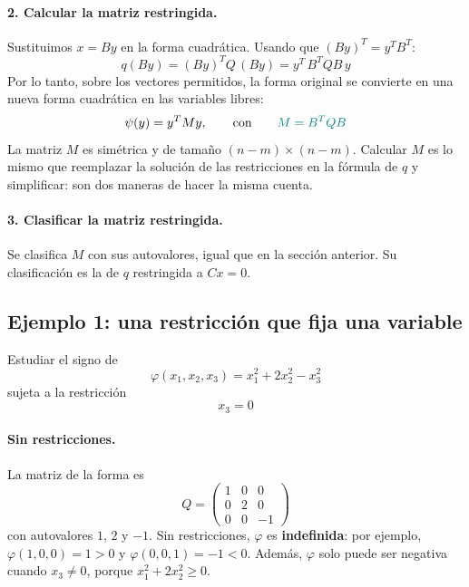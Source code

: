 \documentclass{article}
\begin{document}
\paragraph*{2. Calcular la matriz restringida.}
Sustituimos \(x=By\) en la forma cuadrática. Usando que \((By)^T=y^TB^T\):
\[
q(By)=(By)^T Q\,(By)=y^T\,B^TQB\,y
\]
Por lo tanto, sobre los vectores permitidos, la forma original se convierte en una nueva forma cuadrática en las variables libres:
\[
\psi(y)=y^TMy,
\qquad\text{con}\qquad
\color{teal} M=B^TQB
\]
La matriz \(M\) es simétrica y de tamaño \((n-m)\times(n-m)\). Calcular \(M\) es lo mismo que reemplazar la solución de las restricciones en la fórmula de \(q\) y simplificar: son dos maneras de hacer la misma cuenta.

\paragraph*{3. Clasificar la matriz restringida.}
Se clasifica \(M\) con sus autovalores, igual que en la sección anterior. Su clasificación es la de \(q\) restringida a \(Cx=0\).


\subsection*{Ejemplo 1: una restricción que fija una variable}

Estudiar el signo de
\[
\varphi(x_1,x_2,x_3)=x_1^2+2x_2^2-x_3^2
\]
sujeta a la restricción
\[
x_3=0
\]

\paragraph*{Sin restricciones.}
La matriz de la forma es
\[
Q=
\begin{pmatrix}
1 & 0 & 0\\
0 & 2 & 0\\
0 & 0 & -1
\end{pmatrix}
\]
con autovalores \(1\), \(2\) y \(-1\). Sin restricciones, \(\varphi\) es \textbf{indefinida}: por ejemplo, \(\varphi(1,0,0)=1>0\) y \(\varphi(0,0,1)=-1<0\). Además, \(\varphi\) solo puede ser negativa cuando \(x_3\neq0\), porque \(x_1^2+2x_2^2\ge0\).
\end{document}
